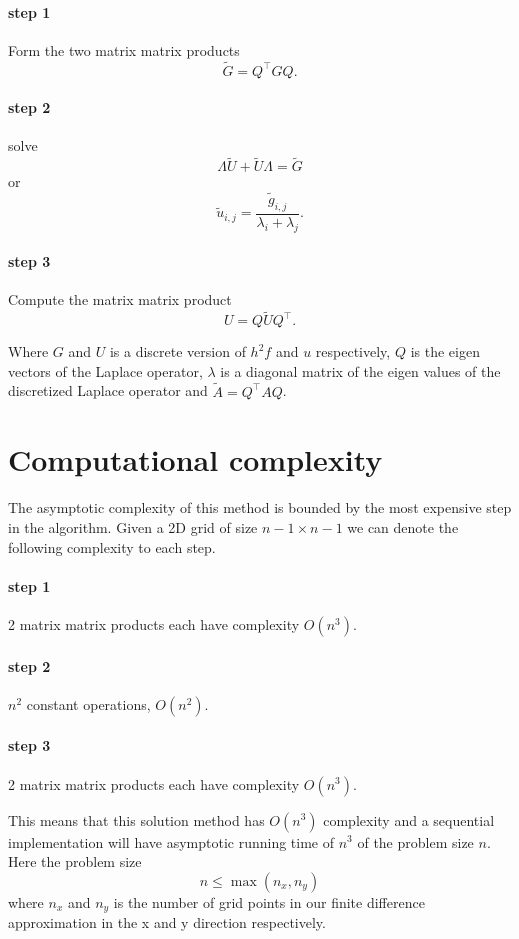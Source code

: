 \documentclass{article}
\begin{document}
\paragraph{step 1}
Form the two matrix matrix products
\[
\tilde{G} = Q^\top G Q.
\]
\paragraph{step 2}
solve
\[
\Lambda \tilde{U} + \tilde{U} \Lambda = \tilde{G}
\]
or
\[
\tilde{u}_{i,j} = \frac{\tilde{g}_{i,j}}{\lambda_i + \lambda_j}.
\]
\paragraph{step 3}
Compute the matrix matrix product
\[
U = Q \tilde{U} Q^\top.
\]

Where $G$ and $U$ is a discrete version of $h^2 f$ and $u$ respectively, $Q$ is the eigen vectors of the Laplace operator,
$\lambda$ is a diagonal matrix of the eigen values of the discretized Laplace operator and $\tilde{A} = Q^\top A Q$.

\section{Computational complexity}
The asymptotic complexity of this method is bounded by the most expensive step
in the algorithm.
Given a 2D grid of size $n-1 \times n-1$ we can denote the following complexity to each step.
\paragraph{step 1}
2 matrix matrix products each have complexity $O(n^3)$.
\paragraph{step 2}
$n^2$ constant operations, $O(n^2)$.
\paragraph{step 3}
2 matrix matrix products each have complexity $O(n^3)$.

This means that this solution method has $O(n^3)$ complexity and a sequential implementation
will have asymptotic running time of $n^3$ of the problem size $n$. Here the problem size
\[
n \leq \max(n_x,n_y)
\]
where $n_x$ and $n_y$ is the number of grid points in our finite difference approximation
in the x and y direction respectively.
\end{document}
